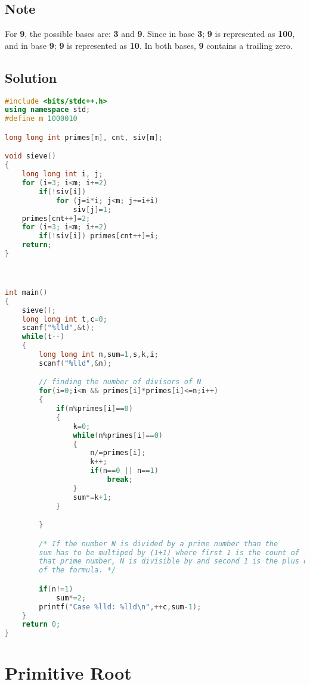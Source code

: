 \documentclass[10pt,a4paper]{article}
\begin{document}
\begin{itemize}
\subsection*{Note}
For \textbf{9}, the possible bases are: \textbf{3} and \textbf{9}. Since in base \textbf{3}; \textbf{9} is represented as \textbf{100}, and in base \textbf{9}; \textbf{9} is represented as \textbf{10}. In both bases, \textbf{9} contains a trailing zero.

\subsection*{Solution}
\begin{lstlisting}[language=C++, caption={Trailing Zeroes (I)}, label={1st:code}, mathescape=true, breaklines=true]
#include <bits/stdc++.h>    
using namespace std;
#define m 1000010

long long int primes[m], cnt, siv[m];

void sieve()
{
    long long int i, j;
    for (i=3; i<m; i+=2)
        if(!siv[i])
            for (j=i*i; j<m; j+=i+i)
                siv[j]=1;
    primes[cnt++]=2;
    for (i=3; i<m; i+=2)
        if(!siv[i]) primes[cnt++]=i;
    return;
}



int main()
{
    sieve();
    long long int t,c=0;
    scanf("%lld",&t);
    while(t--)
    {
        long long int n,sum=1,s,k,i;
        scanf("%lld",&n);

        // finding the number of divisors of N
        for(i=0;i<m && primes[i]*primes[i]<=n;i++)
        {
            if(n%primes[i]==0)
            {
                k=0;
                while(n%primes[i]==0)
                {
                    n/=primes[i];
                    k++;
                    if(n==0 || n==1)
                        break;
                }
                sum*=k+1;
            }

        }

        /* If the number N is divided by a prime number than the
        sum has to be multiped by (1+1) where first 1 is the count of
        that prime number, N is divisible by and second 1 is the plus one
        of the formula. */

        if(n!=1)
            sum*=2;
        printf("Case %lld: %lld\n",++c,sum-1);
    }
    return 0;
}
\end{lstlisting}




\section{Primitive Root}

\end{itemize}
\end{document}

